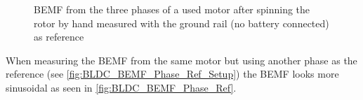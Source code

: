 \documentclass[]{report}
\begin{document}
\begin{figure}[H]
	\centering
	\hfill
	\caption{BEMF from the three phases of a used motor after spinning the rotor by hand measured with the ground rail (no battery connected) as reference}
	\label{fig:BLDC_BEMF_GND_Ref}
\end{figure}

When measuring the BEMF from the same motor but using another phase as the reference (see \autoref{fig:BLDC_BEMF_Phase_Ref_Setup}) the BEMF looks more sinusoidal as seen in \autoref{fig:BLDC_BEMF_Phase_Ref}.
\end{document}

